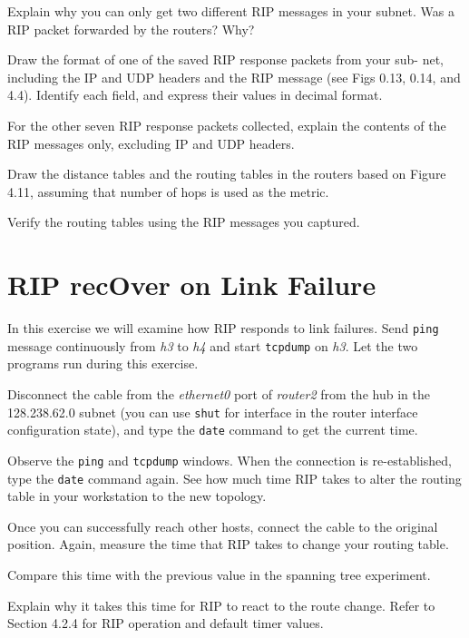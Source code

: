 \documentclass{../UTNetLab}
\begin{document}
    \begin{report}
    \item Explain why you can only get two different RIP messages in your subnet.
    Was a RIP packet forwarded by the routers?
    Why?
    
    \item Draw the format of one of the saved RIP response packets from your sub- net, including the IP and UDP headers and the RIP message (see Figs 0.13, 0.14, and 4.4). Identify each field, and express their values in decimal format.
    
    \item For the other seven RIP response packets collected, explain the contents of the RIP messages only, excluding IP and UDP headers.

    
    \item Draw the distance tables and the routing tables in the routers based on Figure 4.11, assuming that number of hops is used as the metric.

    \item Verify the routing tables using the RIP messages you captured.
    \end{report}


\section{RIP recOver on Link Failure}
    In this exercise we will examine how RIP responds to link failures.
    Send \lstinline{ping} message continuously from \textit{h3} to \textit{h4} and start \lstinline{tcpdump} on \textit{h3}.
    Let the two programs run during this exercise.

    Disconnect the cable from the \textit{ethernet0} port of \textit{router2} from the hub in the 128.238.62.0 subnet (you can use \lstinline[language={cisco}]{shut} for interface in the router interface configuration state), and type the \lstinline{date} command to get the current time.

    Observe the \lstinline{ping} and \lstinline{tcpdump} windows.
    When the connection is re-established, type the \lstinline{date} command again.
    See how much time RIP takes to alter the routing table in your workstation to the new topology.

    Once you can successfully reach other hosts, connect the cable to the original position.
    Again, measure the time that RIP takes to change your routing table.
    
    \begin{report}
    \item Compare this time with the previous value in the spanning tree experiment.
    
    \item Explain why it takes this time for RIP to react to the route change.
        Refer to Section 4.2.4 for RIP operation and default timer values.
    \end{report}
\end{document}
